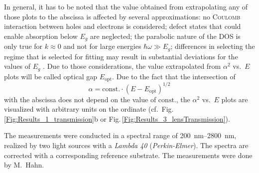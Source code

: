 In general, it has to be noted that the value obtained from extrapolating any of those plots to the abscissa is affected by several approximations:
    no \textsc{Coulomb} interaction between holes and electrons is considered;
    defect states that could enable absorption below $E_g$ are neglected;
    the parabolic nature of the \gls{DOS} is only true for $k\approx0$ and not for large energies $\hbar\omega\gg E_g$;
    differences in selecting the regime that is selected for fitting may result in substantial deviations for the values of $E_g$
    \cite{zanatta2019}.
Due to those considerations, the value extrapolated from $\alpha^2$ vs.\ $E$ plots will be called optical gap $E_\mathrm{opt}$.
Due to the fact that the intersection of 
\begin{equation*}
    \alpha=\mathrm{const.}\cdot(E-E_\mathrm{opt})^{1/2}
\end{equation*}
with the abscissa does not depend on the value of $\mathrm{const.}$, the $\alpha^2$ vs.\ $E$ plots are visualized with arbitrary units on the ordinate (cf.\ Fig.\,\ref{Fig:Results_1_transmission}b or Fig.\,\ref{Fig:Results_3_lensTransmission}).

The measurements were conducted in a spectral range of \qtyrange{200}{2800}{\nm}, realized by two light sources with a \textit{Lambda 40} (\textit{Perkin-Elmer}).
The spectra are corrected with a corresponding reference substrate.
The measurements were done by M.\ Hahn.